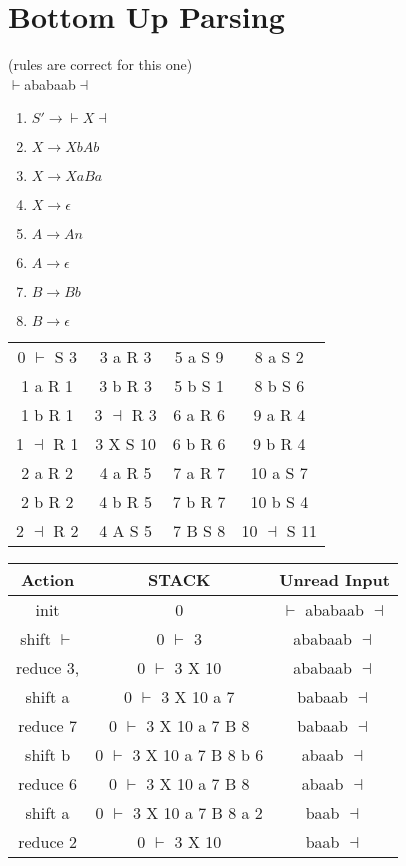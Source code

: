\documentclass[12pt]{article}
\begin{document}
	\section*{Bottom Up Parsing}
	(rules are correct for this one)\\
	$\vdash$ababaab$\dashv$\\
	\begin{enumerate}
		\item $S' \rightarrow \vdash X \dashv$
		\item $X \rightarrow XbAb$
		\item $X \rightarrow XaBa$
		\item $X \rightarrow \epsilon$
		\item $A \rightarrow An$
		\item $A \rightarrow \epsilon$
		\item $B \rightarrow Bb$
		\item $B \rightarrow \epsilon$
	\end{enumerate}
	
	\begin{tabular}{c | c | c | c}
		0 $\vdash$ S 3 & 3 a R 3 & 5 a S 9 & 8 a S 2 \\
		1 a R 1 & 3 b R 3 & 5 b S 1 & 8 b S 6 \\
		1 b R 1 & 3 $\dashv$ R 3 & 6 a R 6 & 9 a R 4 \\
		1 $\dashv$ R 1 & 3 X S 10 & 6 b R 6 & 9 b R 4 \\
		2 a R 2 & 4 a R 5 & 7 a R 7 & 10 a S 7 \\
		2 b R 2 & 4 b R 5 & 7 b R 7 & 10 b S 4 \\
		2 $\dashv$ R 2 & 4 A S 5 & 7 B S 8 & 10 $\dashv$ S 11 \\
	\end{tabular}
	
	\begin{tabular}{c | c | c }
		Action & STACK & Unread Input \\ \hline
		init & 0 & $\vdash$ ababaab $\dashv$\\
		shift $\vdash$ & 0 $\vdash$ 3 & ababaab $\dashv$ \\
		reduce 3, & 0 $\vdash$ 3 X 10 & ababaab $\dashv$ \\
		shift a & 0 $\vdash$ 3 X 10 a 7 & babaab $\dashv$ \\
		reduce 7 & 0 $\vdash$ 3 X 10 a 7 B 8 & babaab $\dashv$ \\
		shift b & 0 $\vdash$ 3 X 10 a 7 B 8 b 6 & abaab $\dashv$ \\
		reduce 6 & 0 $\vdash$ 3 X 10 a 7 B 8 & abaab $\dashv$ \\
		shift a & 0 $\vdash$ 3 X 10 a 7 B 8 a 2 & baab $\dashv$ \\
		reduce 2 & 0 $\vdash$ 3 X 10 & baab $\dashv$\\
	\end{tabular}
	
\end{document}
